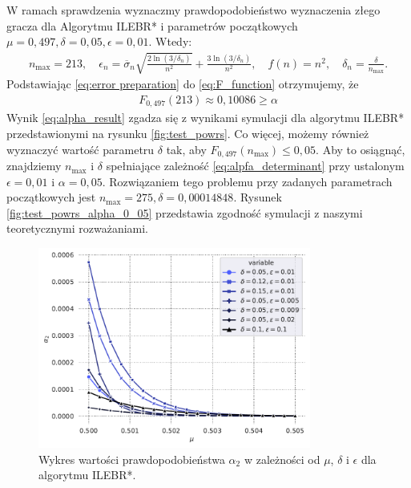 \documentclass[inzynierska]{pwr_wmat_praca_dyplomowa}
\theoremstyle{plain}
\numberwithin{theorem}{chapter}
\theoremstyle{definition}
\numberwithin{theorem}{chapter}
\newcommand{\nmax}{n_{\text{max}}}
\begin{document}
	W ramach sprawdzenia wyznaczmy prawdopodobieństwo wyznaczenia złego gracza dla Algorytmu ILEBR* i parametrów początkowych $\mu = 0,497, \delta=0,05, \epsilon=0,01$.
	Wtedy:
	\begin{gather}
		\label{eq:error preparation}
		\nmax = 213,\quad
		 \epsilon_n = \overline{\sigma}_n \sqrt{\frac{2\ln(3/\delta_n)}{n^2}} + \frac{3  \ln{(3 / \delta_n)}}{n^2},\quad
		  f(n) = n^2,\quad 
		  \delta_n = \frac{\delta}{\nmax}.
	\end{gather}
	Podstawiając \eqref{eq:error preparation} do \eqref{eq:F_function} otrzymujemy, że
	\begin{gather}
		\label{eq:alpha_result}
		F_{0,497}(213)  \approx 0,10086 \ge \alpha
	\end{gather}
	\noindent
	Wynik \eqref{eq:alpha_result} zgadza się z wynikami symulacji dla algorytmu ILEBR* przedstawionymi na rysunku \ref{fig:test_powrs}.
	Co więcej, możemy również wyznaczyć wartość parametru $\delta$ tak, aby $F_{0,497}(\nmax) \le 0,05$. Aby to osiągnąć, znajdziemy $\nmax$ i $\delta$ spełniające zależność \eqref{eq:alpfa_determinant} przy ustalonym $\epsilon = 0,01$ i $\alpha=0,05$.
	Rozwiązaniem tego problemu przy zadanych parametrach początkowych jest $\nmax = 275, \delta = 0,00014848$. Rysunek \ref{fig:test_powrs_alpha_0_05} przedstawia zgodność symulacji z naszymi teoretycznymi rozważaniami.
	\begin{figure}
		\centering
		\includegraphics[width=0.8\textwidth]{imagens/alpha_2.pdf}
		\caption{Wykres wartości prawdopodobieństwa $\alpha_2$ w zależności od $\mu$, $\delta$ i $\epsilon$ dla algorytmu ILEBR*.}
		\label{fig:a2_probability}
	\end{figure}
\end{document}

